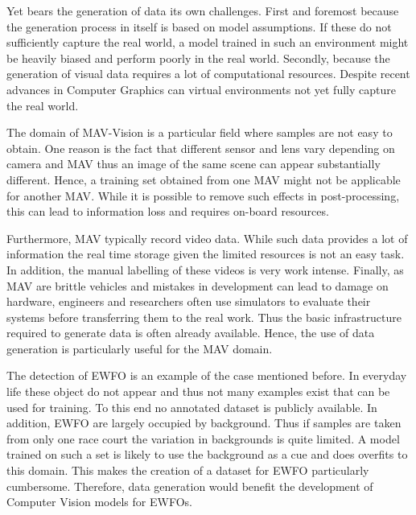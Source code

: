 Yet bears the generation of data its own challenges. First and foremost because the generation process in itself is based on model assumptions. If these do not sufficiently capture the real world, a model trained in such an environment might be heavily biased and perform poorly in the real world. Secondly, because the generation of visual data requires a lot of computational resources. Despite recent advances in Computer Graphics can virtual environments not yet fully capture the real world.

The domain of \ac{MAV}-Vision is a particular field where samples are not easy to obtain. One reason is the fact that different sensor and lens vary depending on camera and \ac{MAV} thus an image of the same scene can appear substantially different. Hence, a training set obtained from one \ac{MAV} might not be applicable for another \ac{MAV}. While it is possible to remove such effects in post-processing, this can lead to information loss and requires on-board resources.

Furthermore, \ac{MAV} typically record video data. While such data provides a lot of information the real time storage given the limited resources is not an easy task. In addition, the manual labelling of these videos is very work intense. Finally, as \ac{MAV} are brittle vehicles and mistakes in development can lead to damage on hardware, engineers and researchers often use simulators to evaluate their systems before transferring them to the real work. Thus the basic infrastructure required to generate data is often already available. Hence, the use of data generation is particularly useful for the \ac{MAV} domain.

The detection of \ac{EWFO} is an example of the case mentioned before. In everyday life these object do not appear and thus not many examples exist that can be used for training. To this end no annotated dataset is publicly available. In addition, \ac{EWFO} are largely occupied by background. Thus if samples are taken from only one race court the variation in backgrounds is quite limited. A model trained on such a set is likely to use the background as a cue and does overfits to this domain. This makes the creation of a dataset for \ac{EWFO} particularly cumbersome. Therefore, data generation would benefit the development of Computer Vision models for \acp{EWFO}.

